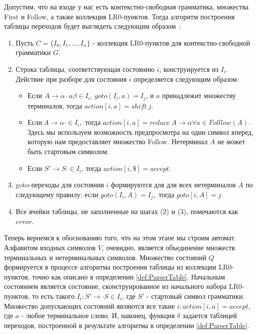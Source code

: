 \begin{mydefinition}
\label{def:ParserTable}
Допустим, что на входе у нас есть контекстно-свободная грамматика, множества First и Follow, а также коллекция LR0-пунктов. Тогда алгоритм построения таблицы переходов будет выглядеть следующим образом~\autocite{lr-parsing}:
\begin{enumerate}
  \item Пусть $C = \{I_0,I_1,...,I_n\}$ - коллекция LR0-пунктов для контекстно-свободной грамматики $G$.
  \item Строка таблицы, соответствующая состоянию $i$, конструируется из $I_i$. Действие при разборе для состояния $i$ определяется следующим образом:
  \begin{itemize}
    \item Если $A \rightarrow \alpha\cdot{a}\beta \in I_i$, $goto(I_i, a) = I_j$, и $a$ принадлежит множеству терминалов, тогда $action[i, a] = shift\ j$.
    \item $\text{Если}\ A \rightarrow \alpha\cdot \in I_i,$ тогда $action[i, a] = reduce\ A \rightarrow \alpha \allowbreak \forall a \in Folllow(A)$. Здесь мы используем возможность предпросмотра на один символ вперед, которую нам предоставляет множество Follow. Нетерминал $A$ не может быть стартовым символом.
    \item Если $S' \rightarrow S\cdot \in I_i$, тогда $action[i, \$] = accept$.
  \end{itemize}
  \item goto-переходы для состояния $i$ формируются для для всех нетерминалов $A$ по следующему правилу: если $goto(I_i, A) = I_j,$ тогда $goto[i, A] = j$.
  \item Все ячейки таблицы, не заполненные на шагах (2) и (3), помечаются как $error$.
\end{enumerate}
\end{mydefinition}

Теперь вернемся к обоснованию того, что на этом этапе мы строим автомат. Алфавитом входных символов $V$, очевидно, является объединение множеств терминальных и нетерминальных символов. Множество состояний $Q$ формируется в процессе алгоритма построения таблицы из коллекции LR0-пунктов, точно как описано в определении \ref{def:ParserTable}. Начальным состоянием является состояние, сконструированное из начального набора LR0-пунктов, то есть такого $I_i : S' \rightarrow \cdot{S} \in I_i$, где $S'$ - стартовый символ грамматики. Множество допускающих состояний являются все такие $i : action[i,a] = accept$, где $a$ - любое терминальное слово. И, наконец, функция $\delta$ задается таблицей переходов, построенной в результате алгоритма в определении \ref{def:ParserTable}.

